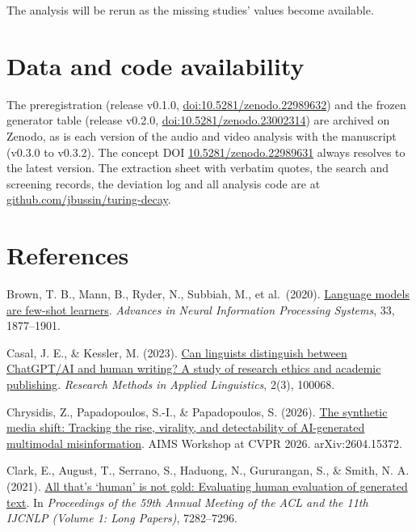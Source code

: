 \documentclass[11pt]{article}
\begin{document}
The analysis will be rerun as the missing studies' values become
available.

\hypertarget{data-and-code-availability}{%
\section{Data and code availability}\label{data-and-code-availability}}

The preregistration (release v0.1.0,
\href{https://doi.org/10.5281/zenodo.22989632}{doi:10.5281/zenodo.22989632})
and the frozen generator table (release v0.2.0,
\href{https://doi.org/10.5281/zenodo.23002314}{doi:10.5281/zenodo.23002314})
are archived on Zenodo, as is each version of the audio and video
analysis with the manuscript (v0.3.0 to v0.3.2). The concept DOI
\href{https://doi.org/10.5281/zenodo.22989631}{10.5281/zenodo.22989631}
always resolves to the latest version. The extraction sheet with
verbatim quotes, the search and screening records, the deviation log and
all analysis code are at
\href{https://github.com/jbussin/turing-decay}{github.com/jbussin/turing-decay}.

\section*{References}
\begingroup
\small
\setlength{\parindent}{-1.5em}
\setlength{\leftskip}{1.5em}
\setlength{\parskip}{3pt}
Brown, T. B., Mann, B., Ryder, N., Subbiah, M., et al.~(2020).
\href{https://arxiv.org/abs/2005.14165}{Language models are few-shot
learners}. \emph{Advances in Neural Information Processing Systems}, 33,
1877--1901.

Casal, J. E., \& Kessler, M. (2023).
\href{https://www.sciencedirect.com/science/article/pii/S2772766123000289}{Can
linguists distinguish between ChatGPT/AI and human writing? A study of
research ethics and academic publishing}. \emph{Research Methods in
Applied Linguistics}, 2(3), 100068.

Chrysidis, Z., Papadopoulos, S.-I., \& Papadopoulos, S. (2026).
\href{https://arxiv.org/abs/2604.15372}{The synthetic media shift:
Tracking the rise, virality, and detectability of AI-generated
multimodal misinformation}. AIMS Workshop at CVPR 2026.
arXiv:2604.15372.

Clark, E., August, T., Serrano, S., Haduong, N., Gururangan, S., \&
Smith, N. A. (2021).
\href{https://aclanthology.org/2021.acl-long.565/}{All that's `human' is
not gold: Evaluating human evaluation of generated text}. In
\emph{Proceedings of the 59th Annual Meeting of the ACL and the 11th
IJCNLP (Volume 1: Long Papers)}, 7282--7296.
\end{document}
